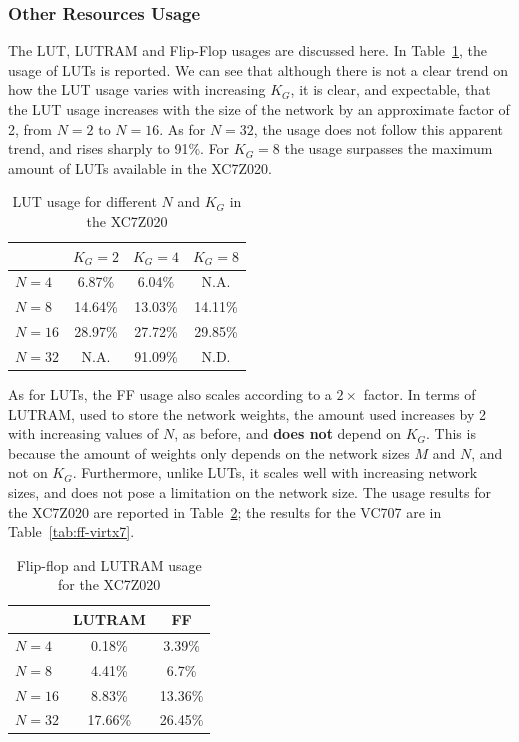 \documentclass[conference]{IEEEtran}
\begin{document}
\subsubsection{Other Resources Usage}\label{sec:res-synth-otheres}
The LUT, LUTRAM and Flip-Flop usages are discussed here. In Table~\ref{tab:lut}, the usage of LUTs is reported. We can see
that although there is not a clear trend on how the LUT usage varies with increasing $K_G$, it is clear, and expectable, that
the LUT usage increases with the size of the network by an approximate factor of 2, from $N=2$ to $N=16$. As for $N=32$, the
usage does not follow this apparent trend, and rises sharply to 91\%. For $K_G = 8$ the usage surpasses the maximum amount
of LUTs available in the XC7Z020.

\begin{table}
	\caption{LUT usage for different $N$ and $K_G$ in the XC7Z020}
	\label{tab:lut}
    \centering
  \begin{tabular}{ | l | c | c | c |}
    \hline
    & $K_G=2$  & $K_G=4$ & $K_G=8$ \\
    \hline
    $N=4$ & 6.87\% & 6.04\% & N.A. \\
    \hline
    $N=8$ & 14.64\% & 13.03\% & 14.11\% \\
    \hline
    $N=16$ & 28.97\% & 27.72\% & 29.85\% \\
    \hline
    $N=32$ & N.A. & 91.09\% & N.D. \\
\hline
  \end{tabular}

\end{table}

As for LUTs, the FF usage also scales according to a $2\times$ factor. In terms of LUTRAM, used to store the network weights,
the amount used increases by 2 with increasing values of $N$, as before, and \textbf{does not} depend on $K_G$. This is because
the amount of weights only depends on the network sizes $M$ and $N$, and not on $K_G$. Furthermore, unlike LUTs, it scales well
with increasing network sizes, and does not pose a limitation on the network size. The usage results for the XC7Z020 are reported in Table~\ref{tab:ff};
the results for the VC707 are in Table~\ref{tab:ff-virtx7}.

\begin{table}
	\caption{Flip-flop and LUTRAM usage for the XC7Z020}
	\label{tab:ff}
    \centering
  \begin{tabular}{ | l | c | c |}
    \hline
         & LUTRAM  & FF  \\
    \hline
    $N=4$ & 0.18\%  & 3.39\% \\
    \hline
    $N=8$ & 4.41\%  & 6.7\% \\
    \hline
    $N=16$ & 8.83\%  & 13.36\% \\
    \hline
    $N=32$ & 17.66\% &  26.45\% \\
\hline
  \end{tabular}

\end{table}
\end{document}
